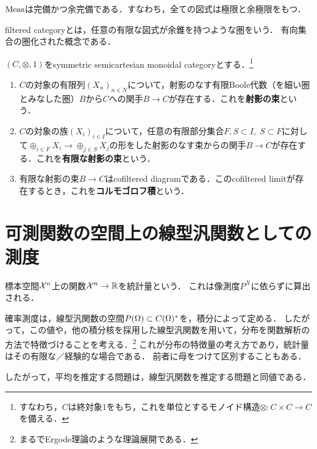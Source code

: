 \documentclass[uplatex,dvipdfmx]{jsreport}
\begin{document}
\begin{proposition}[完備かつ余完備]
    $\mathrm{Meas}$は完備かつ余完備である．すなわち，全ての図式は極限と余極限をもつ．
\end{proposition}

\begin{definition}
    filtered categoryとは，任意の有限な図式が余錐を持つような圏をいう．
    有向集合の圏化された概念である．
\end{definition}

\begin{definition}
    $(C,\otimes,1)$をsymmetric semicartesian monoidal categoryとする．\footnote{すなわち，$C$は終対象$1$をもち，これを単位とするモノイド構造$\otimes:C\times C\to C$を備える．}
    \begin{enumerate}
        \item $C$の対象の有限列$(X_n)_{n\in N}$について，射影のなす有限Boole代数（を細い圏とみなした圏）$B$から$C$への関手$B\to C$が存在する．これを\textbf{射影の束}という．
        \item $C$の対象の族$(X_i)_{i\in I}$について，任意の有限部分集合$F,S\subset I,\;S\subset F$に対して$\oplus_{i\in F}X_i\to\oplus_{j\in S}X_j$の形をした射影のなす束からの関手$B\to C$が存在する．これを\textbf{有限な射影の束}という．
        \item 有限な射影の束$B\to C$はcofiltered diagramである．このcofiltered limitが存在するとき，これを\textbf{コルモゴロフ積}という．
    \end{enumerate}
\end{definition}

\section{可測関数の空間上の線型汎関数としての測度}

\begin{tcolorbox}[colframe=ForestGreen, colback=ForestGreen!10!white,breakable,colbacktitle=ForestGreen!40!white,coltitle=black,fonttitle=\bfseries\sffamily,
title=統計的問題では線型汎関数の推定が主眼となる所以である]
    標本空間$\mathcal{X}^n$上の関数$\mathcal{X}^n\to\mathbb{R}$を統計量という．
    これは像測度$P^X$に依らずに算出される．
    
    確率測度は，線型汎関数の空間$P(\Omega)\subset C(\Omega)^*$を，積分によって定める．
    したがって，この値や，他の積分核を採用した線型汎関数を用いて，分布を関数解析の方法で特徴づけることを考える．\footnote{まるでErgode理論のような理論展開である．}
    これが分布の特徴量の考え方であり，統計量はその有限な／経験的な場合である．
    前者に母をつけて区別することもある．

    したがって，平均を推定する問題は，線型汎関数を推定する問題と同値である．
\end{tcolorbox}
\end{document}
